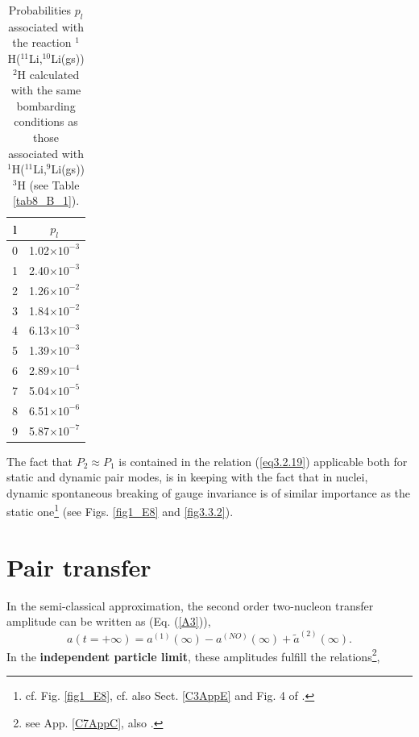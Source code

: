   \begin{table}
  \begin{tabular}{|c|c|}
  \hline  l & $p_l$ \\ 
\hline  0 & 1.02$\times 10^{-3}$ \\ 
\hline  1 & 2.40$\times 10^{-3}$ \\ 
\hline  2 &  1.26$\times 10^{-2}$ \\ 
\hline  3 &  1.84$\times 10^{-2}$ \\ 
\hline  4 &  6.13$\times 10^{-3}$\\ 
\hline  5 &  1.39$\times 10^{-3}$\\ 
\hline  6 &  2.89$\times 10^{-4}$\\ 
\hline  7 &  5.04$\times 10^{-5}$\\ 
\hline  8 &  6.51$\times 10^{-6}$\\ 
\hline  9 &  5.87$\times 10^{-7}$\\
\hline
  \end{tabular}\caption{Probabilities $p_l$  associated with the reaction $^1$H($^{11}$Li,$^{10}$Li(gs))$^2$H calculated with the same bombarding conditions as those associated with $^1$H($^{11}$Li,$^{9}$Li(gs))$^3$H (see Table \ref{tab8_B_1}).}\label{tab3.3.1}
  \end{table}

 The fact that $P_2\approx P_1$ is contained in the relation (\ref{eq3.2.19}) applicable both for static and dynamic pair modes, is in keeping with the fact that in nuclei, dynamic spontaneous breaking of gauge invariance is of similar importance as the static one\footnote{cf. Fig. \ref{fig1_E8}, cf. also Sect. \ref{C3AppE} and Fig. 4 of \cite{Potel:13b}.} (see Figs. \ref{fig1_E8} and \ref{fig3.3.2}). 








\section{Pair transfer}\label{trans_nutAppA}
In the semi-classical approximation, the second order two-nucleon transfer amplitude can be written as (Eq. (\ref{A3})), 
\begin{equation}\label{eq.4.5.1x}
a(t = + \infty) = a^{(1)}(\infty) - a^{(NO)}(\infty) + \tilde a^{(2)} ( \infty).
\end{equation}
   In the \textbf{independent particle limit}, these amplitudes fulfill the relations\footnote{see App. \ref{C7AppC}, also \cite{Potel:13}.},




